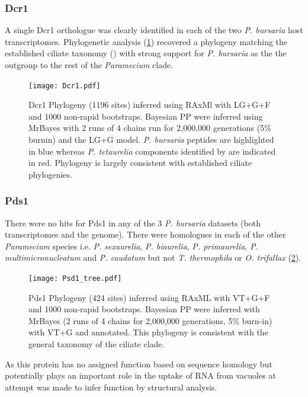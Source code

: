 \subsubsection{Dcr1}

A single Dcr1 orthologue was clearly identified in each of
the two \textit{P. bursaria} host transcriptomes.
Phylogenetic analysis (\cref{fig:dcr1}) recovered a phylogeny
matching the established ciliate taxonomy (\citep{Aury2006,Fokin2004,Swart2013}) 
with strong support for \textit{P. bursaria} as the the outgroup to the rest of 
the \textit{Paramecium} clade. 

\begin{figure}
    \texttt{[image: Dcr1.pdf]}
    \caption[Dcr1 Phylogeny]{Dcr1 Phylogeny (1196 sites) inferred using RAxMl with
        LG+G+F and 1000 non-rapid bootstraps.  Bayesian PP 
        were inferred using MrBayes with 2 runs of 4 chains run for 2,000,000
        generations (5\% burnin) and the LG+G model.  \textit{P. bursaria} peptides
        are highlighted in blue whereas \textit{P. tetaurelia} components
    identified by \citep{Marker2014} are indicated in red.  Phylogeny
is largely consistent with established ciliate phylogenies.}
    \label{fig:dcr1}
\end{figure}


\subsubsection{Pds1}
There were no hits for Pds1 in any of the 3 \textit{P. bursaria} datasets 
(both transcriptomes and the genome).  
There were homologues in each of the other \textit{Paramecium} species
i.e. \textit{P. sexaurelia}, \textit{P. biaurelia}, \textit{P. primaurelia},
\textit{P. multimicronucleatum} and \textit{P. caudatum} but not
\textit{T. thermophila} or \textit{O. trifallax} (\cref{fig:pds1}).
\begin{figure}
    \texttt{[image: Psd1\_tree.pdf]}
    \caption[Pds1 Phylogeny]{Pds1 Phylogeny (424 sites) inferred
        using RAxML with VT+G+F and 1000 non-rapid bootstraps.  Bayesian
        PP were inferred with MrBayes (2 runs of 4 chains for 2,000,000 generations, 5\% burn-in) 
        with VT+G and annotated. This phylogeny is consistent with the general
    taxonomy of the ciliate clade.}
\label{fig:pds1}
\end{figure}

As this protein has no assigned function based on sequence homology
\citep{Marker2014,Carradec2015}
but potentially plays an important role in the uptake of RNA 
from vacuoles at attempt was made to infer 
function by structural analysis. 

